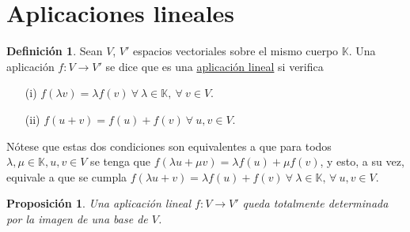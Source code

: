 \documentclass[12pt]{report}
\newtheorem{proposition}{Proposición}[chapter]
\theoremstyle{definition}
\newtheorem{definition}{Definición}[chapter]
\theoremstyle{definition}
\theoremstyle{remark}
\begin{document}
\section{Aplicaciones lineales}

\begin{definition}
Sean $V$, $V'$ espacios vectoriales sobre el mismo cuerpo $\mathbb{K}$. Una aplicación $f \colon V \to V'$ se dice que es una \ul{aplicación lineal} si verifica
\begin{itemize}
    \item[(i)] $f(\lambda v) = \lambda f(v) \ \forall \ \lambda \in \mathbb{K}, \ \forall \ v \in V$.
    \item[(ii)] $f(u+v)=f(u)+f(v) \ \forall \ u,v \in V$.
\end{itemize}
\end{definition}

Nótese que estas dos condiciones son equivalentes a que para todos $\lambda,\mu \in \mathbb{K}, u,v \in V$ se tenga que $f(\lambda u + \mu v) = \lambda f(u) + \mu f(v)$, y esto, a su vez, equivale a que se cumpla $f(\lambda u + v) = \lambda f(u) + f(v) \ \forall \ \lambda \in \mathbb{K}, \, \forall \ u,v \in V$.


\begin{proposition}
Una aplicación lineal $f \colon V \to V'$ queda totalmente determinada por la imagen de una base de $V$.
\end{proposition}
\end{document}
